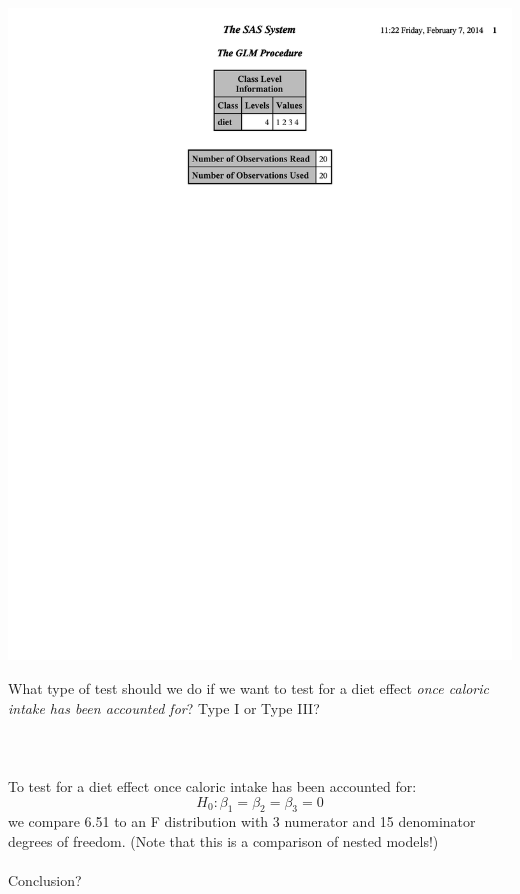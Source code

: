 \begin{flushleft}
\includegraphics[page=3,scale=0.5,trim = 5mm 150mm 5mm 5mm]{DietsANCOVA}
\end{flushleft}

\newpage

What type of test should we do if we want to test for a diet effect \textit{once caloric intake has been accounted for}? Type I or Type III?\\~\\~\\~\\

To test for a diet effect once caloric intake has been accounted for: 
$$H_0: \beta_1 = \beta_2 = \beta_3 =0$$
we compare 6.51 to an F distribution with 3 numerator and 15 denominator degrees of freedom.  (Note that this is a comparison of nested models!)\\~\\

Conclusion?\\  ~\\~\\~\\~\\~\\

